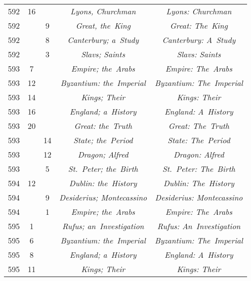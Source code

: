\documentclass[a4paper,11pt]{article}
\begin{document}
\begin{center}
\begin{tabular}{|c|c|c|c|c|}
    592 & 16 & & \emph{Lyons, Churchman} & \emph{Lyons: Churchman} \\
    592 & &  9 & \emph{Great, the~King} & \emph{Great: The~King} \\
    592 & &  8 & \emph{Canterbury; a~Study} & \emph{Canterbury: A~Study} \\
    592 & &  3 & \emph{Slavs; Saints} & \emph{Slavs: Saints} \\
    593 &  7 & & \emph{Empire; the~Arabs} & \emph{Empire: The~Arabs} \\
    593 & 12 & & \emph{Byzantium: the~Imperial}
           & \emph{Byzantium: The~Imperial} \\
    593 & 14 & & \emph{Kings; Their} & \emph{Kings: Their} \\
    593 & 16 & & \emph{England; a~History} & \emph{England: A~History} \\
    593 & 20 & & \emph{Great: the~Truth} & \emph{Great: The~Truth} \\
    593 & & 14 & \emph{State; the~Period} & \emph{State: The~Period} \\
    593 & & 12 & \emph{Dragon; Alfred} & \emph{Dragon: Alfred} \\
    593 & &  5 & \emph{St.~Peter; the~Birth}
           & \emph{St.~Peter: The~Birth} \\
    594 & 12 & & \emph{Dublin: the~History} & \emph{Dublin: The~History} \\
    594 & &  9 & \emph{Desiderius; Montecassino}
           & \emph{Desiderius: Montecassino} \\
    594 & &  1 & \emph{Empire; the~Arabs} & \emph{Empire: The~Arabs} \\
    595 &  1 & & \emph{Rufus; an~Investigation}
           & \emph{Rufus: An~Investigation} \\
    595 &  6 & & \emph{Byzantium: the~Imperial}
           & \emph{Byzantium: The~Imperial} \\
    595 &  8 & & \emph{England; a~History} & \emph{England: A~History} \\
    595 & 11 & & \emph{Kings; Their} & \emph{Kings: Their} \\
    \hline
  \end{tabular}


\end{center}
\end{document}
